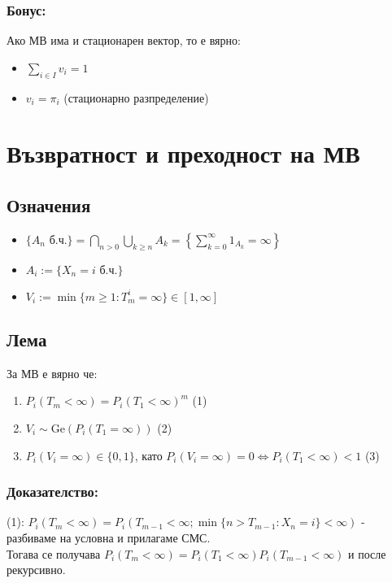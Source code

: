\documentclass{article}
\begin{document}
\subsubsection*{Бонус:}
Ако МВ има и стационарен вектор, то е вярно:
\begin{itemize}
\item $\sum_{i\in I} v_i = 1$
\item $v_i = \pi_i$ (стационарно разпределение)
\end{itemize}

\section{Възвратност и преходност на МВ}

\subsection{Означения}
\begin{itemize}
\item $\{A_n \text{ б.ч.}\} = \bigcap_{n>0} \bigcup_{k\geq n} A_k = \left\{\sum_{k=0}^\infty 1_{A_k} = \infty\right\}$
\item $A_i := \{X_n = i \text{ б.ч.}\}$
\item $V_i := \min\{m \geq 1 : T_m^i = \infty\} \in [1,\infty]$
\end{itemize}

\subsection{Лема}
За МВ е вярно че:
\begin{enumerate}
\item $P_i(T_m < \infty) = P_i(T_1 < \infty)^m$ \quad (1)
\item $V_i \sim \mathrm{Ge}(P_i(T_1 = \infty))$ \quad (2)
\item $P_i(V_i = \infty) \in \{0,1\}$, като $P_i(V_i = \infty) = 0 \Leftrightarrow P_i(T_1 < \infty) < 1$ \quad (3)
\end{enumerate}

\subsubsection*{Доказателство:}
(1): $P_i(T_m < \infty) = P_i(T_{m-1} < \infty; \min\{n > T_{m-1} : X_n = i\} < \infty)$ - разбиваме на условна и прилагаме СМС. \\
Тогава се получава $P_i(T_m < \infty) = P_i(T_1 < \infty)P_i(T_{m-1} < \infty)$ и после рекурсивно. \\
\end{document}
